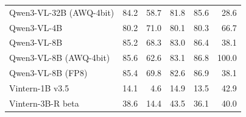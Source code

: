 \begin{table}[t]
\begin{tabular}{lrrrrr}
Qwen3-VL-32B (AWQ-4bit) & 84.2 & 58.7 & 81.8 & 85.6 & 28.6 \\
Qwen3-VL-4B & 80.2 & 71.0 & 80.1 & 80.3 & 66.7 \\
Qwen3-VL-8B & 85.2 & 68.3 & 83.0 & 86.4 & 38.1 \\
Qwen3-VL-8B (AWQ-4bit) & 85.6 & 62.6 & 83.1 & 86.8 & 100.0 \\
Qwen3-VL-8B (FP8) & 85.4 & 69.8 & 82.6 & 86.9 & 38.1 \\
Vintern-1B v3.5 & 14.1 & 4.6 & 14.9 & 13.5 & 42.9 \\
Vintern-3B-R beta & 38.6 & 14.4 & 43.5 & 36.1 & 40.0 \\
\bottomrule
\end{tabular}
\par{}
\end{table}
